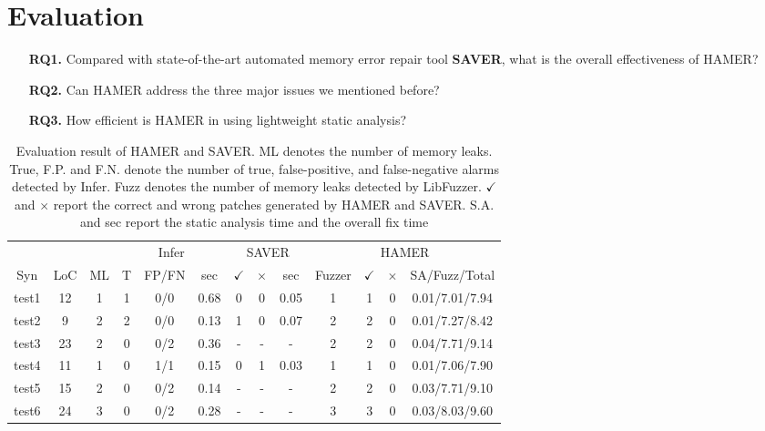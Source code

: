 \documentclass[a4paper,11pt,oneside,openany]{book}
\begin{document}

\chapter{Evaluation}
\begin{itemize}
\item[\textbf{RQ1.}] Compared with state-of-the-art automated memory error repair tool \textbf{SAVER}, what is the overall effectiveness of HAMER?
\item[\textbf{RQ2.}] Can HAMER address the three major issues we mentioned before? 
\item[\textbf{RQ3.}] How efficient is HAMER in using lightweight static analysis?
\end{itemize}

\begin{table}[h]
  \caption[Evaluation result]{Evaluation result of HAMER and SAVER. ML denotes the number of memory leaks. True, F.P. and F.N. denote the number of true, false-positive, and false-negative alarms detected by Infer. Fuzz denotes the number of memory leaks detected by LibFuzzer. $\checkmark$ and $\times$ report the correct and wrong patches generated by HAMER and SAVER. S.A. and sec report the static analysis time and the overall fix time }
  \label{evaluationresult}
  \centering
  \begin{tabular}{ccc|ccc|ccc|cccc}
                 &        &        &  \multicolumn{3}{|c|}{Infer}&  \multicolumn{3}{|c|}{SAVER}  & \multicolumn{4}{|c}{HAMER}  \\
   Syn & LoC & ML& T & FP/FN & sec & $\checkmark$ & $\times$ & sec & Fuzzer & $\checkmark$ & $\times$ & SA/Fuzz/Total  \\
    \hline
    test1     & 12    & 1  & 1  & 0/0     & 0.68  & 0  & 0  & 0.05      & 1   & 1    & 0  & 0.01/7.01/7.94 \\
    test2     & 9    & 2  & 2  & 0/0     & 0.13  & 1  & 0  & 0.07      & 2   & 2    & 0  & 0.01/7.27/8.42 \\
    test3     & 23    & 2  & 0  & 0/2     & 0.36  & -  & -  & -      & 2   & 2    & 0  & 0.04/7.71/9.14 \\
    test4     & 11    & 1  & 0  & 1/1     & 0.15  & 0  & 1  & 0.03      & 1   & 1    & 0  & 0.01/7.06/7.90 \\
    test5     & 15    & 2  & 0  & 0/2     & 0.14  & -  & -  & -      & 2   & 2    & 0  & 0.03/7.71/9.10 \\
    test6     & 24    & 3  & 0  & 0/2     & 0.28  & -  & -  & -      & 3   & 3    & 0  & 0.03/8.03/9.60 \\

\end{tabular}
\end{table}
\end{document}
